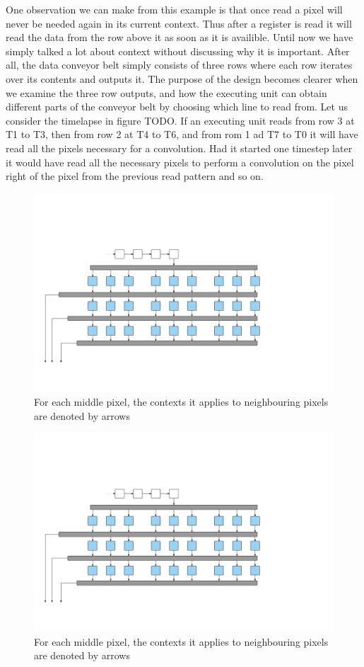 One observation we can make from this example is that once read a pixel will never be needed again in its current context. Thus after a register is read it will read the data from the row above it as soon as it is availible.
Until now we have simply talked a lot about context without discussing why it is important. After all, the data conveyor belt simply consists of three rows where each row iterates over its contents and outputs it.
The purpose of the design becomes clearer when we examine the three row outputs, and how the executing unit can obtain different parts of the conveyor belt by choosing which line to read from. 
Let us consider the timelapse in figure TODO. If an executing unit reads from row 3 at T1 to T3, then from row 2 at T4 to T6, and from rom 1 ad T7 to T0 it will have read all the pixels necessary for a convolution.
Had it started one timestep later it would have read all the necessary pixels to perform a convolution on the pixel right of the pixel from the previous read pattern and so on.
\begin{figure}[h!]
    \includegraphics[width=\linewidth]{img/IdealFeeder.png}
    \caption{For each middle pixel, the contexts it applies to neighbouring pixels are denoted by arrows}
    \label{fig:Contexts}
\end{figure}

\begin{figure}[h!]
    \includegraphics[width=\linewidth]{img/IdealFeeder.png}
    \caption{For each middle pixel, the contexts it applies to neighbouring pixels are denoted by arrows}
    \label{fig:Contexts}
\end{figure}

